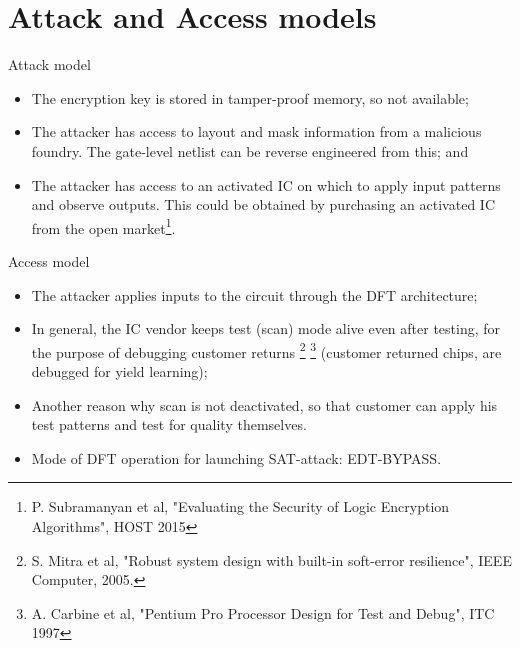 \section{Attack and Access models}
\begin{frame}{Attack model}
\begin{itemize}
\item The encryption key is stored in tamper-proof memory, so not available; 
\item The attacker has access to layout and mask information from a malicious foundry. The gate-level netlist can be reverse engineered from this;  and 
\item The attacker has access to an activated IC on which to apply input patterns and observe outputs. This could be obtained by purchasing an activated IC from the open market\footnote{P. Subramanyan et al, "Evaluating the Security of Logic Encryption Algorithms", HOST 2015}. 
\end{itemize}
\end{frame}

\begin{frame}{Access model}
\begin{itemize}
\item The attacker applies inputs to the circuit through the DFT architecture; 
\item In general, the IC vendor keeps test (scan) mode alive even after testing, for the purpose of debugging customer returns \footnote{S. Mitra et al, "Robust system design with built-in soft-error resilience", IEEE Computer, 2005.} \footnote{A. Carbine et al, "Pentium Pro Processor Design for Test and Debug", ITC 1997} (customer returned chips, are debugged for yield learning); 
\item Another reason why scan is not deactivated, so that customer can apply his test patterns and test for quality themselves. 
\item Mode of DFT operation for launching SAT-attack: EDT-BYPASS.
\end{itemize}
\end{frame}
